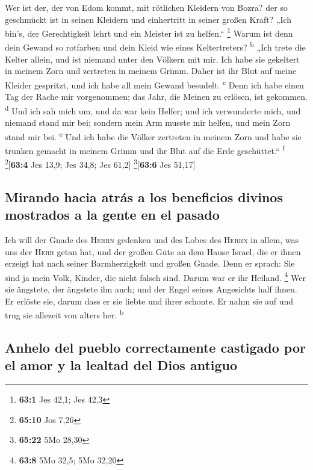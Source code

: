  Wer ist der, der von Edom kommt, mit rötlichen Kleidern
von Bozra? der so geschmückt ist in seinen Kleidern und einhertritt in
seiner großen Kraft? „Ich bin's, der Gerechtigkeit lehrt und ein Meister
ist zu helfen.`` \footnote{\textbf{63:1} Jes 42,1; Jes 42,3}
 Warum ist denn dein Gewand so rotfarben und dein Kleid
wie eines Keltertreters? \textsuperscript{b}  „Ich trete
die Kelter allein, und ist niemand unter den Völkern mit mir. Ich habe
sie gekeltert in meinem Zorn und zertreten in meinem Grimm. Daher ist
ihr Blut auf meine Kleider gespritzt, und ich habe all mein Gewand
besudelt. \textsuperscript{c}  Denn ich habe einen Tag der
Rache mir vorgenommen; das Jahr, die Meinen zu erlösen, ist gekommen.
\textsuperscript{d}  Und ich sah mich um, und da war kein
Helfer; und ich verwunderte mich, und niemand stand mir bei; sondern
mein Arm musste mir helfen, und mein Zorn stand mir bei.
\textsuperscript{e}  Und ich habe die Völker zertreten in
meinem Zorn und habe sie trunken gemacht in meinem Grimm und ihr Blut
auf die Erde geschüttet.`` \textsuperscript{f}
\footnote{\textbf{65:10} Jos 7,26}{[}\textbf{63:4} Jes 13,9; Jes 34,8;
Jes 61,2{]} \footnote{\textbf{65:22} 5Mo 28,30}{[}\textbf{63:6} Jes
51,17{]}

\hypertarget{mirando-hacia-atruxe1s-a-los-beneficios-divinos-mostrados-a-la-gente-en-el-pasado}{%
\subsection{Mirando hacia atrás a los beneficios divinos mostrados a la
gente en el
pasado}\label{mirando-hacia-atruxe1s-a-los-beneficios-divinos-mostrados-a-la-gente-en-el-pasado}}

 Ich will der Gnade des \textsc{Herrn} gedenken und des
Lobes des \textsc{Herrn} in allem, was uns der \textsc{Herr} getan hat,
und der großen Güte an dem Hause Israel, die er ihnen erzeigt hat nach
seiner Barmherzigkeit und großen Gnade.  Denn er sprach:
Sie sind ja mein Volk, Kinder, die nicht falsch sind. Darum war er ihr
Heiland. \footnote{\textbf{63:8} 5Mo 32,5; 5Mo 32,20}  Wer
sie ängstete, der ängstete ihn auch; und der Engel seines Angesichts
half ihnen. Er erlöste sie, darum dass er sie liebte und ihrer schonte.
Er nahm sie auf und trug sie allezeit von alters her.
\textsuperscript{b}

\hypertarget{anhelo-del-pueblo-correctamente-castigado-por-el-amor-y-la-lealtad-del-dios-antiguo}{%
\subsection{Anhelo del pueblo correctamente castigado por el amor y la
lealtad del Dios
antiguo}\label{anhelo-del-pueblo-correctamente-castigado-por-el-amor-y-la-lealtad-del-dios-antiguo}}

